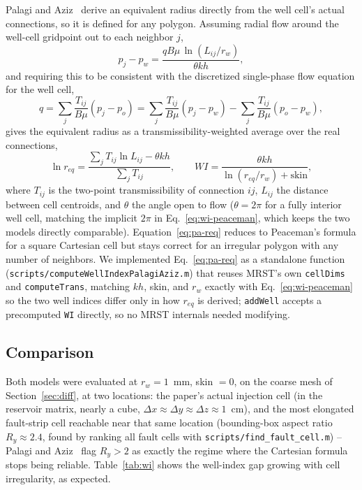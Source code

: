 \documentclass[preprint,11pt]{elsarticle}
\begin{document}
Palagi and Aziz~\cite{palagi1994a,palagi1994b} derive an equivalent
radius directly from the well cell's actual connections, so it is defined
for any polygon. Assuming radial flow around the well-cell gridpoint out
to each neighbor $j$,
\begin{equation}
p_j - p_w = \frac{qB\mu\,\ln(L_{ij}/r_w)}{\theta kh},
\label{eq:pa-radial}
\end{equation}
and requiring this to be consistent with the discretized single-phase
flow equation for the well cell,
\begin{equation}
q = \sum_j \frac{T_{ij}}{B\mu}(p_j - p_o)
  = \sum_j \frac{T_{ij}}{B\mu}(p_j - p_w) - \sum_j
    \frac{T_{ij}}{B\mu}(p_o - p_w),
\label{eq:pa-discrete}
\end{equation}
gives the equivalent radius as a transmissibility-weighted average over
the real connections,
\begin{equation}
\ln r_{eq} = \frac{\sum_j T_{ij}\ln L_{ij} - \theta kh}{\sum_j T_{ij}},
\qquad
WI = \frac{\theta kh}{\ln(r_{eq}/r_w) + \mathrm{skin}},
\label{eq:pa-req}
\end{equation}
where $T_{ij}$ is the two-point transmissibility of connection $ij$,
$L_{ij}$ the distance between cell centroids, and $\theta$ the angle open
to flow ($\theta=2\pi$ for a fully interior well cell, matching the
implicit $2\pi$ in Eq.~\eqref{eq:wi-peaceman}, which keeps the two models
directly comparable). Equation~\eqref{eq:pa-req} reduces to Peaceman's
formula for a square Cartesian cell but stays correct for an irregular
polygon with any number of neighbors. We implemented
Eq.~\eqref{eq:pa-req} as a standalone function
(\texttt{scripts/computeWellIndexPalagiAziz.m}) that reuses MRST's own
\texttt{cellDims} and \texttt{computeTrans}, matching $kh$, skin, and
$r_w$ exactly with Eq.~\eqref{eq:wi-peaceman} so the two well indices
differ only in how $r_{eq}$ is derived; \texttt{addWell} accepts a
precomputed \texttt{WI} directly, so no MRST internals needed modifying.

\subsection{Comparison}

Both models were evaluated at $r_w=1$~mm, skin $=0$, on the coarse mesh
of Section~\ref{sec:diff}, at two locations: the paper's actual injection
cell (in the reservoir matrix, nearly a cube,
$\Delta x\approx\Delta y\approx\Delta z\approx1$~cm), and the most
elongated fault-strip cell reachable near that same location (bounding-box
aspect ratio $R_y\approx2.4$, found by ranking all fault cells with
\texttt{scripts/find\_fault\_cell.m}) -- Palagi and Aziz~\cite{palagi1994b}
flag $R_y>2$ as exactly the regime where the Cartesian formula stops being
reliable. Table~\ref{tab:wi} shows the well-index gap growing with cell
irregularity, as expected.
\end{document}
